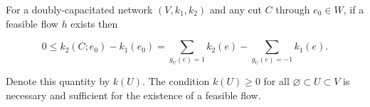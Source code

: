For a doubly-capacitated network $(V, k_1, k_2)$ and any cut $C$ through $e_0 \in W$, if a feasible flow $h$ exists then

$$0 \leq k_2(C; e_0) - k_1(e_0) = \sum_{g_U(e)=1} k_2(e) - \sum_{g_U(e)=-1} k_1(e).$$

Denote this quantity by $k(U)$. The condition $k(U) \geq 0$ for all $\varnothing \subset U \subset V$ is necessary and sufficient for the existence of a feasible flow.
